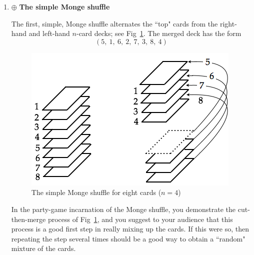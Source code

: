 \begin{enumerate}
  \begin{enumerate}
  \item $\oplus$ {\bf The simple Monge shuffle}

\smallskip

The first, simple, Monge shuffle alternates the ``top" cards from the right-hand and left-hand $n$-card decks; see Fig~\ref{fig:suffleMonge}.  The merged deck has the form
\[ (5, \ 1, \ 6, \ 2, \ 7, \ 3, \ 8, \ 4) \]
\begin{figure}[h]
\begin{center}
        \includegraphics[scale=0.4]{FiguresArithmetic/suffleMongeBasic}
        \caption{The simple Monge shuffle for eight cards ($n=4$)}
        \label{fig:suffleMonge}
\end{center}
\end{figure}

In the party-game incarnation of the Monge shuffle, you demonstrate the cut-then-merge process of Fig~\ref{fig:suffleMonge}, and you suggest to your audience that this process is a good first step in really mixing up the cards.  If this were so, then repeating the step several times should be a good way to obtain a ``random" mixture of the cards.

\smallskip


\end{enumerate}
\end{enumerate}
